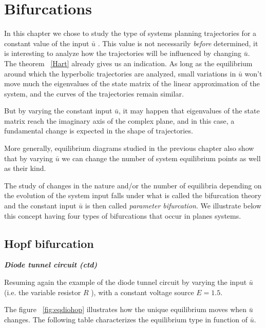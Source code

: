 {%

\section{Bifurcations}

In this chapter we chose to study the type of systems planning trajectories for a constant 
value of the input $\bar u$ . This value is not necessarily {\em before} determined, 
it is interesting to analyze how the trajectories will be influenced by changing $\bar u$.
The theorem ~\ref{Hart} already gives us an indication. As long as the equilibrium around
which the hyperbolic trajectories are analyzed, small variations in $\bar u$
won't move much the eigenvalues of the state matrix of the linear approximation
of the system, and the curves of the trajectories remain similar.

But by varying the constant input $\bar u$, it may happen that eigenvalues of the state matrix 
reach the imaginary axis of the complex plane, and
in this case, a fundamental change is expected in the shape of trajectories.

More generally, equilibrium diagrams studied in the previous chapter also show that by
varying $\bar u$ we can change the number of system equilibrium points as well as their kind.

The study of changes in the nature and/or the number of
equilibria depending on the evolution of the system input
falls under what is called the bifurcation theory and the constant input $\bar u$ is then
called {\em parameter bifurcation}. We illustrate below this concept
having four types of bifurcations that occur in planes systems.

\subsection{Hopf bifurcation}

\begin{exemple} {\em\bf Diode tunnel circuit (ctd)}

Resuming again the example of the diode tunnel circuit by varying the input
$\bar u$ (i.e. the variable resistor $R$ ), with a constant voltage source $E = 1.5$.

The figure ~\ref{fig:eqdiohop} illustrates how the unique equilibrium moves when $\bar u$ changes. 
The following table characterizes the equilibrium type in function of $\bar u$.


\end{exemple}}
